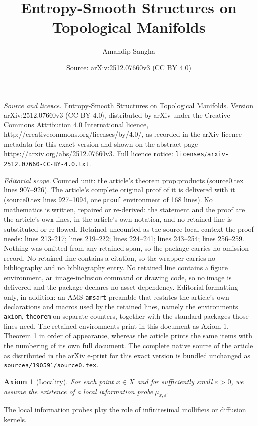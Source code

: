 \documentclass[10pt,a4paper]{amsart}
\title{Entropy-Smooth Structures on Topological Manifolds}
\author{Amandip Sangha}
\date{Source: arXiv:2512.07660v3 (CC BY 4.0)}
\newtheorem{axiom}{Axiom}
\begin{document}
\maketitle

\noindent\emph{Source and licence.} Entropy-Smooth Structures on Topological Manifolds. Version arXiv:2512.07660v3 (CC BY 4.0), distributed by arXiv under the Creative Commons Attribution 4.0 International licence, http://creativecommons.org/licenses/by/4.0/, as recorded in the arXiv licence metadata for this exact version and shown on the abstract page https://arxiv.org/abs/2512.07660v3. Full licence notice: \texttt{licenses/arxiv-2512.07660-CC-BY-4.0.txt}.\par\smallskip

\noindent\textit{Editorial scope.} Counted unit: the article's theorem prop:products (source0.tex lines 907--926). The article's complete original proof of it is delivered with it (source0.tex lines 927--1094, one \texttt{proof} environment of 168 lines). No mathematics is written, repaired or re-derived: the statement and the proof are the article's own lines, in the article's own notation, and no retained line is substituted or re-flowed.  Retained uncounted as the source-local context the proof needs: lines 213--217; lines 219--222; lines 224--241; lines 243--254; lines 256--259.  Nothing was omitted from any retained span, so the package carries no omission record.  No retained line contains a citation, so the wrapper carries no bibliography and no bibliography entry.  No retained line contains a figure environment, an image-inclusion command or drawing code, so no image is delivered and the package declares no asset dependency.  Editorial formatting only, in addition: an AMS \texttt{amsart} preamble that restates the article's own declarations and macros used by the retained lines, namely the environments \texttt{axiom}, \texttt{theorem} on separate counters, together with the standard packages those lines need.  The retained environments print in this document as Axiom 1, Theorem 1 in order of appearance, whereas the article prints the same items with the numbering of its own full document.  The complete native source of the article as distributed in the arXiv e-print for this exact version is bundled unchanged as \texttt{sources/190591/source0.tex}.
\begin{axiom}[Locality]
\label{axiom:1}
For each point $x\in X$ and for sufficiently small $\varepsilon>0$, we assume the existence of a local information probe $\mu_{x,\varepsilon}$.
\end{axiom}
The local information probes play the role of infinitesimal mollifiers or diffusion kernels.
\end{document}
